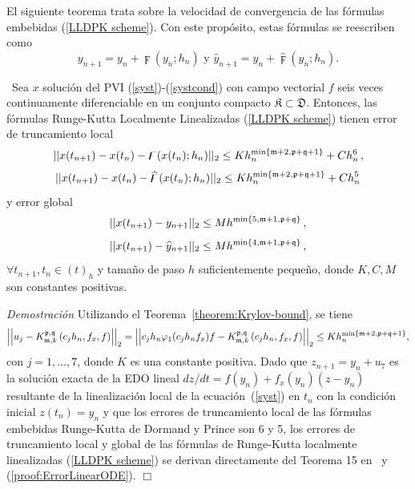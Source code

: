 El siguiente teorema trata sobre la velocidad de convergencia de las fórmulas embebidas (\ref{LLDPK scheme}). Con este propósito, estas fórmulas se reescriben como
\begin{equation*}
    y_{n+1}=y_{n}+\digamma (y_{n};h_{n})\text{ \ \ \ \ y \ \ \ \ }\widehat{y}_{n+1}=y_{n}+\widehat{\digamma }(y_{n};h_{n}).
\end{equation*}


\begin{theorem}\label{theorem:lldp-convergence}
	\cite{naranjo2021locally}~Sea $x$ solución del PVI (\ref{syst})-(\ref{systcond}) con campo vectorial $f$ seis veces continuamente diferenciable en un conjunto compacto $\mathfrak{K} \subset \mathfrak{D}$. Entonces, las fórmulas Runge-Kutta Localmente Linealizadas (\ref{LLDPK scheme}) tienen error de truncamiento local
	\[\lvert\lvert x(t_{n+1}) - x(t_n) - \digamma(x(t_n);h_n) \rvert\rvert_2 \leq Kh_n^{\mathrm{min}\left\{ \mathfrak{m}+2,\mathfrak{p}+\mathfrak{q}+1 \right\}}+C h_n^{6}\,,  \]
	\[\lvert\lvert x(t_{n+1}) - x(t_n) - \widehat{\digamma }(x(t_n);h_n) \rvert\rvert_2 \leq Kh_n^{\mathrm{min}\left\{ \mathfrak{m}+2,\mathfrak{p}+\mathfrak{q}+1 \right\}}+C h_n^{5}  \]
	y error global
	\[ \lvert\lvert x(t_{n+1}) - y_{n+1} \rvert\rvert_2 \leq M h^{\mathrm{min}\left\{5,\mathfrak{m}+1,\mathfrak{p}+\mathfrak{q} \right\}}\,, \]
	\[ \lvert\lvert x(t_{n+1}) - \widehat{y}_{n+1} \rvert\rvert_2 \leq M h^{\mathrm{min}\left\{ 4,\mathfrak{m}+1,\mathfrak{p}+\mathfrak{q} \right\}}\,, \]
	$\forall t_{n+1},t_n\in(t)_h$ y tamaño de paso $h$ suficientemente pequeño, donde  $K,C,M$ son constantes positivas.
\end{theorem}
\emph{Demostración} Utilizando el Teorema~\ref{theorem:Krylov-bound}, se tiene
\begin{equation}\label{proof:ErrorLinearODE}
\left\lvert \left\lvert  u_j-K_{\mathfrak{m},k}^{\mathfrak{p},\mathfrak{q}}\left(c_j h_n,f_x , f \right)  \right\rvert \right\rvert_2 =  \left\lvert \left\lvert c_jh_n\varphi_1(c_jh_nf_x)f - K_{\mathfrak{m},k}^{\mathfrak{p},\mathfrak{q}}\left(c_j h_n, f_x , f \right)  \right\rvert \right\rvert_2 \le Kh_n^{\mathrm{min}\left\{ \mathfrak{m}+2,\mathfrak{p}+\mathfrak{q}+1 \right\}},
\end{equation}
con $j=1,\ldots,7$, donde $K$ es una constante positiva. Dado que $z_{n+1} = y_n + u_7$ es la solución exacta de la EDO lineal $dz/dt=f(y_n)+f_x(y_n)(z-y_n)$ resultante de la linealización local de la ecuación~(\ref{syst}) en $t_n$ con la condición inicial $z(t_n)=y_n$ y que los errores de truncamiento local de las fórmulas embebidas Runge-Kutta de Dormand y Prince son 6 y 5, los errores de truncamiento local y global de las fórmulas de Runge-Kutta localmente linealizadas (\ref{LLDPK scheme}) se derivan directamente del Teorema 15 en~\cite{Jimenez13} y (\ref{proof:ErrorLinearODE}). $\Box$\\

